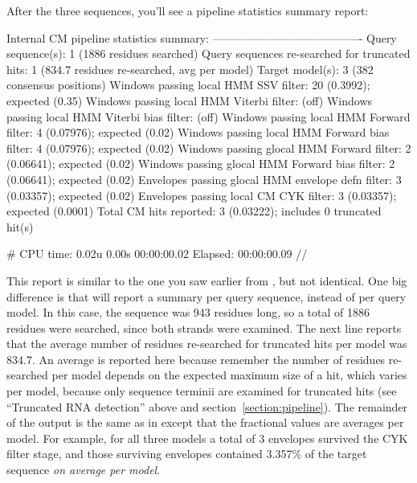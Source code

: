 After the three sequences, you'll see a pipeline statistics summary
report:

\newpage

\begin{widesreoutput}
Internal CM pipeline statistics summary:
----------------------------------------
Query sequence(s):                                               1  (1886 residues searched)
Query sequences re-searched for truncated hits:                  1  (834.7 residues re-searched, avg per model)
Target model(s):                                                 3  (382 consensus positions)
Windows   passing  local HMM SSV           filter:              20  (0.3992); expected (0.35)
Windows   passing  local HMM Viterbi       filter:                  (off)
Windows   passing  local HMM Viterbi  bias filter:                  (off)
Windows   passing  local HMM Forward       filter:               4  (0.07976); expected (0.02)
Windows   passing  local HMM Forward  bias filter:               4  (0.07976); expected (0.02)
Windows   passing glocal HMM Forward       filter:               2  (0.06641); expected (0.02)
Windows   passing glocal HMM Forward  bias filter:               2  (0.06641); expected (0.02)
Envelopes passing glocal HMM envelope defn filter:               3  (0.03357); expected (0.02)
Envelopes passing  local CM  CYK           filter:               3  (0.03357); expected (0.0001)
Total CM hits reported:                                          3  (0.03222); includes 0 truncated hit(s)

# CPU time: 0.02u 0.00s 00:00:00.02 Elapsed: 00:00:00.09
//
\end{widesreoutput}

This report is similar to the one you saw earlier from
, but not identical. One big difference is that
 will report a summary per query sequence, instead of per
query model. In this case, the sequence was 943 residues long, so a
total of 1886 residues were searched, since both strands were
examined. The next line reports that the average number of residues
re-searched for truncated hits per model was 834.7. An average is
reported here because remember the number of residues re-searched per
model depends on the expected maximum size of a hit, which varies per
model, because only sequence terminii are examined for truncated hits
(see ``Truncated RNA detection'' above and
section~\ref{section:pipeline}).  The remainder of the output is the
same as in  except that the fractional values are
averages per model. For example, for all three models a total of 3
envelopes survived the CYK filter stage, and those surviving envelopes
contained 3.357\% of the target sequence \emph{on average per model}.

